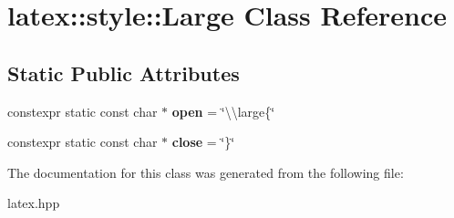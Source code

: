 \hypertarget{classlatex_1_1style_1_1Large}{\section{latex\-:\-:style\-:\-:Large Class Reference}
\label{classlatex_1_1style_1_1Large}
}
\subsection*{Static Public Attributes}
\begin{DoxyCompactItemize}
\item 
\hypertarget{classlatex_1_1style_1_1Large_aeda83a01ded8b49a2952336684c01ce8}{constexpr static const char $\ast$ {\bfseries open} = \char`\"{}\textbackslash{}\textbackslash{}large\{\char`\"{}}\label{classlatex_1_1style_1_1Large_aeda83a01ded8b49a2952336684c01ce8}

\item 
\hypertarget{classlatex_1_1style_1_1Large_a7920d55c91d0975f916bb07d49e3d8e8}{constexpr static const char $\ast$ {\bfseries close} = \char`\"{}\}\char`\"{}}\label{classlatex_1_1style_1_1Large_a7920d55c91d0975f916bb07d49e3d8e8}

\end{DoxyCompactItemize}


The documentation for this class was generated from the following file\-:\begin{DoxyCompactItemize}
\item 
latex.\-hpp\end{DoxyCompactItemize}
